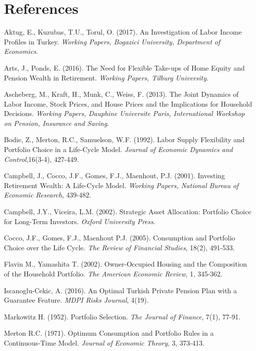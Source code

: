 \documentclass[]{article}
\begin{document}
\section*{References}

\begingroup
\singlespace
\begin{description}
\item Aktug, E., Kuzubas, T.U., Torul, O. (2017). An Investigation of Labor Income Profiles in Turkey. \textit{Working Papers, Bogazici University, Department of Economics}.
\item Arts, J., Ponds, E. (2016). The Need for Flexible Take-ups of Home Equity and Pension Wealth in Retirement. \textit{Working Papers, Tilburg University}.
\item Ascheberg, M., Kraft, H., Munk, C., Weiss, F. (2013). The Joint Dynamics of Labor Income, Stock Prices, and House Prices and the Implications for Household Decisions. \textit{Working Papers, Dauphine Universite Paris, International Workshop on Pension, Insurance and Saving}.
\item Bodie, Z., Merton, R.C., Samuelson, W.F. (1992). Labor Supply Flexibility and Portfolio Choice in a Life-Cycle Model. \textit{Journal of Economic Dynamics and Control},16(3-4), 427-449. 
\item Campbell, J., Cocco, J.F., Gomes, F.J., Maenhout, P.J. (2001). Investing Retirement Wealth: A Life-Cycle Model. \textit{Working Papers, National Bureau of Economic Research}, 439-482.
\item Campbell, J.Y., Viceira, L.M. (2002). Strategic Asset Allocation: Portfolio Choice for Long-Term Investors. \textit{Oxford University Press}.
\item Cocco, J.F., Gomes, F.J., Maenhout P.J. (2005). Consumption and Portfolio Choice over the Life Cycle. \textit{The Review of Financial Studies}, 18(2), 491-533. 
\item Flavin M., Yamashita T. (2002). Owner-Occupied Housing and the Composition of the Household Portfolio. \textit{The American Economic Review}, 1, 345-362.
\item Iscanoglu-Cekic, A. (2016). An Optimal Turkish Private Pension Plan with a Guarantee Feature. \textit{MDPI Risks Journal}, 4(19).
\item Markowitz H. (1952). Portfolio Selection. \textit{The Journal of Finance}, 7(1), 77-91.
\item Merton R.C. (1971). Optimum Consumption and Portfolio Rules in a Continuous-Time Model. \textit{Journal of Economic Theory}, 3, 373-413.

\end{description}
\end{document}

